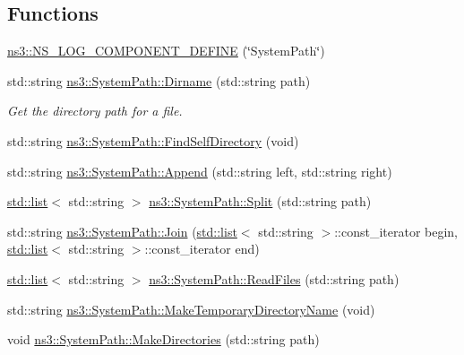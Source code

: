 \subsection*{Functions}
\begin{DoxyCompactItemize}
\item 
\hyperlink{namespacens3_a7d0ea9eb6e4464727e4ae1c0fffaef92}{ns3\+::\+N\+S\+\_\+\+L\+O\+G\+\_\+\+C\+O\+M\+P\+O\+N\+E\+N\+T\+\_\+\+D\+E\+F\+I\+NE} (\char`\"{}System\+Path\char`\"{})
\item 
std\+::string \hyperlink{group__systempath_ga657599fb7660fc6ebe4b6aaea0021176}{ns3\+::\+System\+Path\+::\+Dirname} (std\+::string path)
\begin{DoxyCompactList}\small\item\em Get the directory path for a file. \end{DoxyCompactList}\item 
std\+::string \hyperlink{group__systempath_gad52e6f153465b40487da3a2a9ee5f5d6}{ns3\+::\+System\+Path\+::\+Find\+Self\+Directory} (void)
\item 
std\+::string \hyperlink{group__systempath_gaaa5a530cee42c8eda7e4f4523ef7e1cd}{ns3\+::\+System\+Path\+::\+Append} (std\+::string left, std\+::string right)
\item 
\hyperlink{openflow-interface_8h_afd9bcfa176617760671b67580f536fa7}{std\+::list}$<$ std\+::string $>$ \hyperlink{group__systempath_ga523072e05da63b63113d1bea840edf1a}{ns3\+::\+System\+Path\+::\+Split} (std\+::string path)
\item 
std\+::string \hyperlink{group__systempath_gab3212957e6b4f873ece3c6b8ed746d72}{ns3\+::\+System\+Path\+::\+Join} (\hyperlink{openflow-interface_8h_afd9bcfa176617760671b67580f536fa7}{std\+::list}$<$ std\+::string $>$\+::const\+\_\+iterator begin, \hyperlink{openflow-interface_8h_afd9bcfa176617760671b67580f536fa7}{std\+::list}$<$ std\+::string $>$\+::const\+\_\+iterator end)
\item 
\hyperlink{openflow-interface_8h_afd9bcfa176617760671b67580f536fa7}{std\+::list}$<$ std\+::string $>$ \hyperlink{group__systempath_ga152a348bccf02d8373607b0239587b87}{ns3\+::\+System\+Path\+::\+Read\+Files} (std\+::string path)
\item 
std\+::string \hyperlink{group__systempath_ga271d7de64c9f6454db57fe21bc51c5d0}{ns3\+::\+System\+Path\+::\+Make\+Temporary\+Directory\+Name} (void)
\item 
void \hyperlink{group__systempath_ga9529f7530ba5d513c8811acc15743d24}{ns3\+::\+System\+Path\+::\+Make\+Directories} (std\+::string path)
\end{DoxyCompactItemize}


